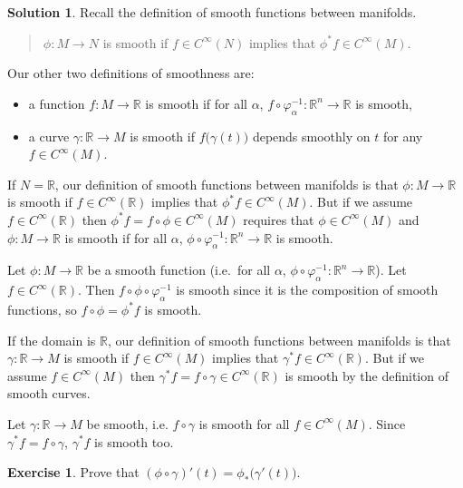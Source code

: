 \documentclass[11pt, a4paper]{report}
\theoremstyle{definition}
\newtheorem{ex}{Exercise}[part]
\newtheorem{sol}{Solution}[part]
\begin{document}
\begin{sol}

Recall the definition of smooth functions between manifolds.

\begin{quote}
    $\phi: M \to N$ is smooth if $f \in C^\infty(N)$ implies that $\phi^* f \in C^\infty(M)$.
\end{quote}

Our other two definitions of smoothness are:
\begin{itemize}
    \item a function $f: M \to \mathbb{R}$ is smooth if for all $\alpha$, $f \circ \varphi_\alpha^{-1}: \mathbb{R}^n \to \mathbb{R}$ is smooth,
    \item a curve $\gamma: \mathbb{R} \to M$ is smooth if $f \bigl( \gamma(t) \bigr)$ depends smoothly on $t$ for any $f \in C^\infty(M)$.
\end{itemize}

If $N = \mathbb{R}$, our definition of smooth functions between manifolds is that $\phi: M \to \mathbb{R}$ is smooth if $f \in C^\infty(\mathbb{R})$ implies that $\phi^* f \in C^\infty(M)$.
But if we assume $f \in C^\infty(\mathbb{R})$ then $\phi^* f = f \circ \phi \in C^\infty(M)$ requires that $\phi \in C^\infty(M)$ and $\phi: M \to \mathbb{R}$ is smooth if for all $\alpha$, $\phi \circ \varphi_\alpha^{-1}: \mathbb{R}^n \to \mathbb{R}$ is smooth.

Let $\phi: M \to \mathbb{R}$ be a smooth function (i.e.\ for all $\alpha$, $\phi \circ \varphi_\alpha^{-1}: \mathbb{R}^n \to \mathbb{R}$).
Let $f \in C^\infty(\mathbb{R})$.
Then $f \circ \phi \circ \varphi_\alpha^{-1}$ is smooth since it is the composition of smooth functions, so $f \circ \phi = \phi^* f$ is smooth.

If the domain is $\mathbb{R}$, our definition of smooth functions between manifolds is that $\gamma: \mathbb{R} \to M$ is smooth if $f \in C^\infty(M)$ implies that $\gamma^* f \in C^\infty(\mathbb{R})$.
But if we assume $f \in C^\infty(M)$ then $\gamma^* f = f \circ \gamma \in C^\infty(\mathbb{R})$ is smooth by the definition of smooth curves.

Let $\gamma: \mathbb{R} \to M$ be smooth, i.e. $f\circ \gamma$ is smooth for all $f \in C^\infty(M)$.
Since $\gamma^* f = f \circ \gamma$, $\gamma^* f$ is smooth too.

\end{sol}

\begin{ex}

Prove that $(\phi \circ \gamma)'(t) = \phi_* \bigl( \gamma'(t) \bigr)$.

\end{ex}
\end{document}
